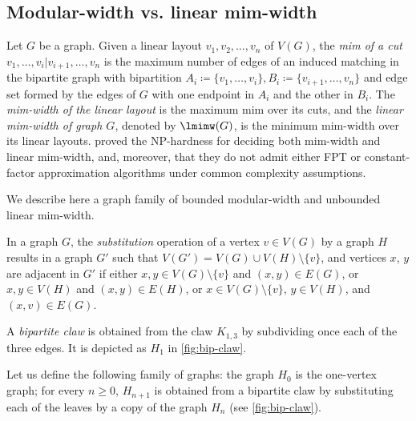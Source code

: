 \documentclass[11pt]{article}
\theoremstyle{plain}
\theoremstyle{definition}
\theoremstyle{remark}
\newcommand{\FPT}{{\smaller[0.83]\textsf{\textup{FPT}}}\xspace}
\newcommand{\NP}{{\smaller[0.83]\textsf{\textup{NP}}}}
\begin{document}

% 

\label{sec:biblio}


\newpage
\begin{appendices}


\section{Modular-width vs. linear mim-width}\label{sec:modw-vs-lmimw}

Let $G$ be a graph. Given a linear layout $v_1,v_2, \dots, v_n$ of $V(G)$, the \textit{mim of a cut} $v_1, \dots, v_i | v_{i+1}, \dots, v_n$
is the maximum number of edges of an induced matching in the bipartite graph with bipartition $A_i\coloneqq\{v_1, \dots, v_i\}, B_i\coloneqq\{v_{i+1}, \dots, v_n\}$ and edge set formed by the edges of $G$ with one endpoint in $A_i$ and the other in $B_i$. The \textit{mim-width of the linear layout} is the maximum mim over its cuts, and the \textit{linear mim-width of graph $G$}, denoted by $\lmimw(G)$, is the minimum mim-width over its linear layouts.
\citet{Saether-branch} proved the \NP-hardness for deciding both mim-width and linear mim-width, and, moreover, that they do not admit either \FPT or constant-factor approximation algorithms under common complexity assumptions.

We describe here a graph family of bounded modular-width and unbounded linear mim-width. 

In a graph $G$, the \emph{substitution} operation of a vertex $v \in V(G)$ by a graph $H$
results in a graph $G'$ such that $V(G') = V(G) \cup V(H) \setminus
\{v\}$, and  vertices $x$, $y$ are adjacent in $G'$ if either $x, y \in V(G)
\setminus \{v\}$ and $(x,y) \in E(G)$, or $x, y \in V(H)$ and $(x,y) \in
E(H)$, or $x \in V(G) \setminus \{v\}$, $y \in V(H)$, and $(x,v) \in
E(G)$.

A \emph{bipartite claw} is obtained from the claw $K_{1,3}$ by subdividing once each of the three edges. It is depicted as $H_1$ in \autoref{fig:bip-claw}.

Let us define the following family of graphs: the graph $H_0$ is the one-vertex graph;
for every $n \geq 0$, $H_{n+1}$ is obtained from a bipartite claw by substituting each of the leaves by a copy of the graph $H_n$ (see \autoref{fig:bip-claw}). 


\end{appendices}
\end{document}
